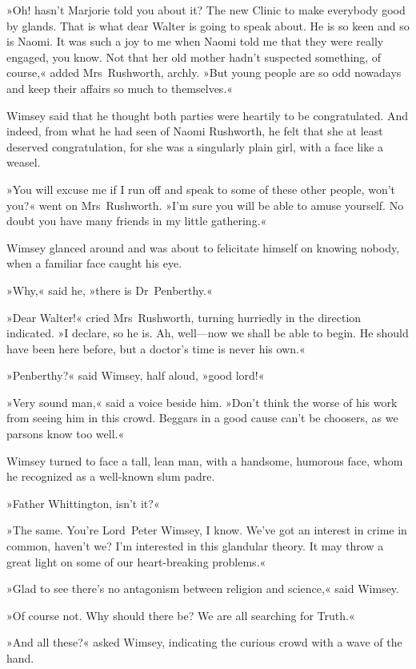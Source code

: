 »Oh! hasn't Marjorie told you about it? The new Clinic to make everybody good by glands. That is what dear Walter is going to speak about. He is so keen and so is Naomi. It was such a joy to me when Naomi told me that they were really engaged, you know. Not that her old mother hadn't suspected something, of course,« added Mrs~Rushworth, archly. »But young people are so odd nowadays and keep their affairs so much to themselves.«

Wimsey said that he thought both parties were heartily to be congratulated. And indeed, from what he had seen of Naomi Rushworth, he felt that she at least deserved congratulation, for she was a singularly plain girl, with a face like a weasel.

»You will excuse me if I run off and speak to some of these other people, won't you?« went on Mrs~Rushworth. »I'm sure you will be able to amuse yourself. No doubt you have many friends in my little gathering.«

Wimsey glanced around and was about to felicitate himself on knowing nobody, when a familiar face caught his eye.

»Why,« said he, »there is Dr~Penberthy.«

»Dear Walter!« cried Mrs~Rushworth, turning hurriedly in the direction indicated. »I declare, so he is. Ah, well—now we shall be able to begin. He should have been here before, but a doctor's time is never his own.«

»Penberthy?« said Wimsey, half aloud, »good lord!«

»Very sound man,« said a voice beside him. »Don't think the worse of his work from seeing him in this crowd. Beggars in a good cause can't be choosers, as we parsons know too well.«

Wimsey turned to face a tall, lean man, with a handsome, humorous face, whom he recognized as a well-known slum padre.

»Father Whittington, isn't it?«

»The same. You're Lord~Peter Wimsey, I know. We've got an interest in crime in common, haven't we? I'm interested in this glandular theory. It may throw a great light on some of our heart-breaking problems.«

»Glad to see there's no antagonism between religion and science,« said Wimsey.

»Of course not. Why should there be? We are all searching for Truth.«

»And all these?« asked Wimsey, indicating the curious crowd with a wave of the hand.

